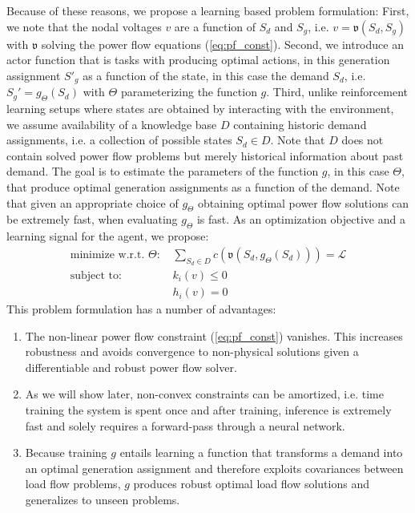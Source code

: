 Because of these reasons, we propose a learning based problem formulation: First, we note that the nodal voltages $v$ are a function of $S_d$ and $S_g$, i.e. $v = \mathfrak{v}(S_d,S_g)$ with $\mathfrak{v}$ solving the power flow equations (\ref{eq:pf_const}). Second, we introduce an actor function that is tasks with producing optimal actions, in this generation assignment $S'_g$ as a function of the state, in this case the demand $S_d$, i.e. $S_g' = g_\Theta(S_d)$ with $\Theta$ parameterizing the function $g$. Third, unlike reinforcement learning setups where states are obtained by interacting with the environment, we assume availability of a knowledge base $D$ containing historic demand assignments, i.e. a collection of possible states $S_d \in D$. Note that $D$ does not contain solved power flow problems but merely historical information about past demand. The goal is to estimate the parameters of the function $g$, in this case $\Theta$, that produce optimal generation assignments as a function of the demand. Note that given an appropriate choice of $g_\Theta$ obtaining optimal power flow solutions can be extremely fast, when evaluating $g_\Theta$ is fast. As an optimization objective and a learning signal for the agent, we propose:
\begin{align}
\text{minimize w.r.t. $\Theta$:\ }& \sum_{S_d \in D} c(\mathfrak{v}(S_d,g_\Theta(S_d))) = \mathcal{L} \label{LOPF_obj}\\
\text{subject to:\ }& k_i(v) \leq 0 \label{const1}\\
 			    & h_i(v) = 0  \label{const2}
\end{align}
This problem formulation has a number of advantages:
\begin{enumerate}
\item The non-linear power flow constraint (\ref{eq:pf_const}) vanishes. This increases robustness and avoids convergence to non-physical solutions given a differentiable and robust power flow solver.
\item As we will show later, non-convex constraints can be amortized, i.e. time training the system is spent once and after training, inference is extremely fast and solely requires a forward-pass through a neural network.
\item Because training $g$ entails learning a function that transforms a demand into an optimal generation assignment and therefore exploits covariances between load flow problems, $g$ produces robust optimal load flow solutions and generalizes to unseen problems.
\end{enumerate}

